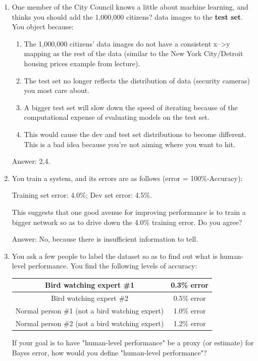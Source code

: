 \documentclass[12pt]{article}
\numberwithin{equation}{section}
\begin{document}
\begin{enumerate}
	\item One member of the City Council knows a little about machine learning, and thinks you should add the 1,000,000 citizens? data images to the \textbf{test set}. You object because:
		\begin{enumerate}
		\item The 1,000,000 citizens' data images do not have a consistent x-->y mapping as the rest of the data (similar to the New York City/Detroit housing prices example from lecture).
		\item The test set no longer reflects the distribution of data (security cameras) you most care about.
		\item A bigger test set will slow down the speed of iterating because of the computational expense of evaluating models on the test set.
		\item This would cause the dev and test set distributions to become different. This is a bad idea because you're not aiming where you want to hit.
		\end{enumerate} \par
	Answer: 2,4.
	\item You train a system, and its errors are as follows (error = 100\%-Accuracy):\par
	Training set error: 4.0\%; Dev set error: 4.5\%. \par
	This suggests that one good avenue for improving performance is to train a bigger network so as to drive down the 4.0\% training error. Do you agree? \par
	Answer: No, because there is insufficient information to tell.
	\item You ask a few people to label the dataset so as to find out what is human-level performance. You find the following levels of accuracy: \par
	\begin{table}[h!]
  		\centering
  		\begin{tabular}{c|c}
    			Bird watching expert \#1 & 0.3\% error\\ \hline
			Bird watching expert \#2 & 0.5\% error\\ \hline
			Normal person \#1 (not a bird watching expert) & 1.0\% error\\ \hline
			Normal person \#2 (not a bird watching expert) & 1.2\% error\\
  		\end{tabular}
	\end{table} \par
	If your goal is to have "human-level performance" be a proxy (or estimate) for Bayes error, how would you define "human-level performance"?\par

\end{enumerate}
\end{document}
